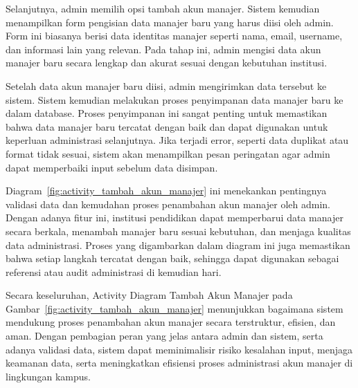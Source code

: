 \documentclass[a4paper,oneside,11pt]{book}
\begin{document}
Selanjutnya, admin memilih opsi tambah akun manajer. Sistem kemudian menampilkan form pengisian data manajer baru yang harus diisi oleh admin. Form ini biasanya berisi data identitas manajer seperti nama, email, username, dan informasi lain yang relevan. Pada tahap ini, admin mengisi data akun manajer baru secara lengkap dan akurat sesuai dengan kebutuhan institusi.

Setelah data akun manajer baru diisi, admin mengirimkan data tersebut ke sistem. Sistem kemudian melakukan proses penyimpanan data manajer baru ke dalam database. Proses penyimpanan ini sangat penting untuk memastikan bahwa data manajer baru tercatat dengan baik dan dapat digunakan untuk keperluan administrasi selanjutnya. Jika terjadi error, seperti data duplikat atau format tidak sesuai, sistem akan menampilkan pesan peringatan agar admin dapat memperbaiki input sebelum data disimpan.

Diagram~\ref{fig:activity_tambah_akun_manajer} ini menekankan pentingnya validasi data dan kemudahan proses penambahan akun manajer oleh admin. Dengan adanya fitur ini, institusi pendidikan dapat memperbarui data manajer secara berkala, menambah manajer baru sesuai kebutuhan, dan menjaga kualitas data administrasi. Proses yang digambarkan dalam diagram ini juga memastikan bahwa setiap langkah tercatat dengan baik, sehingga dapat digunakan sebagai referensi atau audit administrasi di kemudian hari.

Secara keseluruhan, Activity Diagram Tambah Akun Manajer pada Gambar~\ref{fig:activity_tambah_akun_manajer} menunjukkan bagaimana sistem mendukung proses penambahan akun manajer secara terstruktur, efisien, dan aman. Dengan pembagian peran yang jelas antara admin dan sistem, serta adanya validasi data, sistem dapat meminimalisir risiko kesalahan input, menjaga keamanan data, serta meningkatkan efisiensi proses administrasi akun manajer di lingkungan kampus.
\end{document}

